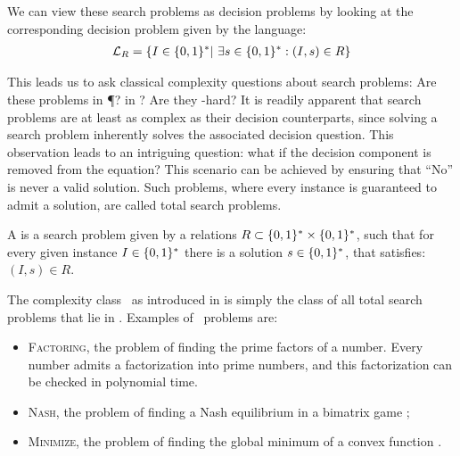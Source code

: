 We can view these search problems as decision problems by looking at the corresponding decision problem given by the language:
\begin{align*}
    \mathcal{L}_R = \{ I \in \{0, 1\}^* |\ \exists s \in \{0, 1\}^* : (I, s) \in R\}
\end{align*}

This leads us to ask classical complexity questions about search problems: Are these problems in \P? in \NP? Are they \NP-hard? It is readily apparent that search problems are at least as complex as their decision counterparts, since solving a search problem inherently solves the associated decision question. This observation leads to an intriguing question: what if the decision component is removed from the equation? This scenario can be achieved by ensuring that ``No'' is never a valid solution. Such problems, where every instance is guaranteed to admit a solution, are called total search problems.

\begin{definition}
    A  is a search problem given by a relations $R\subset \{0, 1\}^* \times \{0, 1\}^*$, such that for every given instance $I\in
        \{0, 1\}^*$ there is a solution $s \in \{0, 1\}^*$, that satisfies: $(I, s) \in R$.
\end{definition}

The complexity class \TFNP\ as introduced in  is simply the class of all total search problems that lie in \NP. Examples of \TFNP\ problems are:
\begin{itemize}
    \item \textsc{Factoring}, the problem of finding the prime factors of a number. Every number admits a factorization into prime numbers, and this factorization can be checked in polynomial time.
    \item \textsc{Nash}, the problem of finding a Nash equilibrium in a bimatrix game ;
    \item \textsc{Minimize}, the problem of finding the global minimum of a convex function .
\end{itemize}

